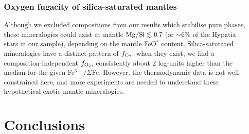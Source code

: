 \documentclass[fleqn,usenatbib,twocolumn]{mnras}
\newcommand{\fo}{$f_{\ce{O2}}$}
\newcommand{\xfer}{Fe$^{3+}/\Sigma$Fe}
\newcommand{\todo}[1]{\textit{\textcolor{violet}{{#1}}}}
\begin{document}
\subsubsection{Oxygen fugacity of silica-saturated mantles}\label{sec:discussion-sio2}

Although we excluded compositions from our results which stabilise pure  phases, these mineralogies could exist at mantle ${\rm Mg/Si} \lesssim 0.7$ (or $\sim$6\% of the Hypatia stars in our sample), depending on the mantle FeO$^*$ content. %
Silica-saturated mineralogies have a distinct pattern of \fo: when they exist, we find a composition-independent \fo, consistently about 2 log-units higher than the median for the given \xfer. %
However, the thermodynamic data is not well-constrained here, and more experiments are needed to understand these hypothetical exotic mantle mineralogies.










   

\section{Conclusions}
\label{sec:conclusion}
\end{document}
